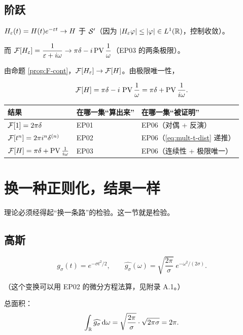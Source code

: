 \subsection{阶跃}

$H_\varepsilon(t)=H(t)e^{-\varepsilon t}\to H$ 于 $\mathcal{S}'$（因为 $|H_\varepsilon\varphi|\le|\varphi|\in L^1(\mathbb{R})$，控制收敛）。

而 $\mathcal{F}[H_\varepsilon]=\dfrac{1}{\varepsilon+i\omega}\to\pi\delta-i\operatorname{PV}\dfrac{1}{\omega}$（EP03 的两条极限）。

由命题 \ref{prop:F-cont}，$\mathcal{F}[H_\varepsilon]\to\mathcal{F}[H]$。由极限唯一性，

\begin{equation}
\mathcal{F}[H]=\pi\delta-i\,\operatorname{PV}\frac{1}{\omega}=\pi\delta+\operatorname{PV}\frac{1}{i\omega} .\label{eq:FH-final}
\end{equation}

\begin{center}
\small
\renewcommand{\arraystretch}{1.4}
\begin{tabularx}{\textwidth}{@{}L{4.4cm}L{4.0cm}Y@{}}
\toprule
结果 & 在哪一集“算出来” & 在哪一集“被证明” \\
\midrule
$\mathcal{F}[1]=2\pi\delta$ & EP01 & EP06（对偶 + 反演）\\
$\mathcal{F}[t^{n}]=2\pi i^{n}\delta^{(n)}$ & EP02 & EP06（\eqref{eq:mult-t-dist} 递推）\\
$\mathcal{F}[H]=\pi\delta+\operatorname{PV}\frac{1}{i\omega}$ & EP03 & EP06（连续性 + 极限唯一）\\
\bottomrule
\end{tabularx}
\end{center}

\section{换一种正则化，结果一样}

理论必须经得起“换一条路”的检验。这一节就是检验。

\subsection{高斯}

\begin{equation}
g_\sigma(t)=e^{-\sigma t^{2}/2},
\qquad
\widehat{g_\sigma}(\omega)=\sqrt{\frac{2\pi}{\sigma}}\;e^{-\omega^{2}/(2\sigma)} .
\end{equation}

（这个变换可以用 EP02 的微分方程法算，见附录 A.1。）

总面积：
\begin{equation}
\int_{\mathbb{R}}\widehat{g_\sigma}\mathop{}\!\mathrm{d}\omega=\sqrt{\frac{2\pi}{\sigma}}\cdot\sqrt{2\pi\sigma}=2\pi .
\end{equation}

